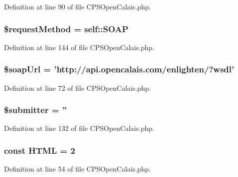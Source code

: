 Definition at line 90 of file CPSOpenCalais.php.

\hypertarget{classCPSOpenCalais_a37c866e0dd005b2054896f4c4fb88132}{
\subsubsection[{\$requestMethod}]{\setlength{\rightskip}{0pt plus 5cm}\$requestMethod = self::SOAP}}
\label{classCPSOpenCalais_a37c866e0dd005b2054896f4c4fb88132}


Definition at line 144 of file CPSOpenCalais.php.

\hypertarget{classCPSOpenCalais_a07eadf024580d87646e290d38176c8a7}{
\subsubsection[{\$soapUrl}]{\setlength{\rightskip}{0pt plus 5cm}\$soapUrl = 'http://api.opencalais.com/enlighten/?wsdl'}}
\label{classCPSOpenCalais_a07eadf024580d87646e290d38176c8a7}


Definition at line 72 of file CPSOpenCalais.php.

\hypertarget{classCPSOpenCalais_a317ab5774a65de21409c3f9715e5c50c}{
\subsubsection[{\$submitter}]{\setlength{\rightskip}{0pt plus 5cm}\$submitter = ''}}
\label{classCPSOpenCalais_a317ab5774a65de21409c3f9715e5c50c}


Definition at line 132 of file CPSOpenCalais.php.

\hypertarget{classCPSOpenCalais_ac124904e08a9542af2a219df5f9472e6}{
\subsubsection[{HTML}]{\setlength{\rightskip}{0pt plus 5cm}const {\bf HTML} = 2}}
\label{classCPSOpenCalais_ac124904e08a9542af2a219df5f9472e6}


Definition at line 54 of file CPSOpenCalais.php.

